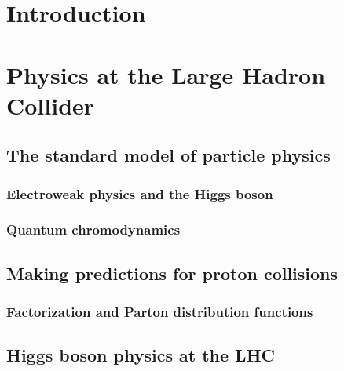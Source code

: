 \documentclass{harvard-thesis}
\begin{document}

\maketitle
\copyrightpage
\abstractpage
\tableofcontents
\dedicationpage
\authorlist
\acknowledgments



\chapter{Introduction}


\chapter{Physics at the Large Hadron Collider}

\section{The standard model of particle physics}
\subsection{Electroweak physics and the Higgs boson}
\subsection{Quantum chromodynamics}
\section{Making predictions for proton collisions}
\subsection{Factorization and Parton distribution functions}
\section{Higgs boson physics at the LHC}
\end{document}
